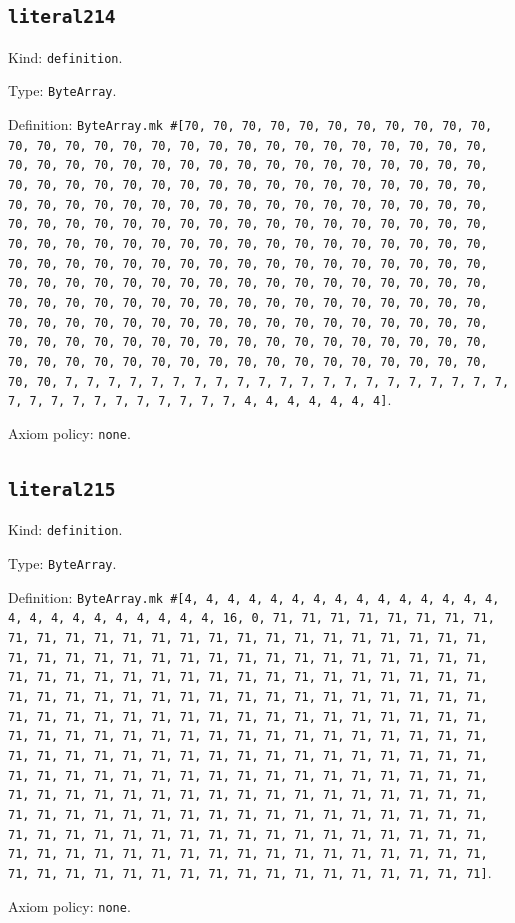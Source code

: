 \documentclass[11pt]{article}
\begin{document}
\subsection*{\texttt{literal214}}
\noindent Kind: \texttt{definition}.\par
\noindent Type: \texttt{ByteArray}.\par
\noindent Definition: \texttt{ByteArray.mk \#[70, 70, 70, 70, 70, 70, 70, 70, 70, 70, 70, 70, 70, 70, 70, 70, 70, 70, 70, 70, 70, 70, 70, 70, 70, 70, 70, 70, 70, 70, 70, 70, 70, 70, 70, 70, 70, 70, 70, 70, 70, 70, 70, 70, 70, 70, 70, 70, 70, 70, 70, 70, 70, 70, 70, 70, 70, 70, 70, 70, 70, 70, 70, 70, 70, 70, 70, 70, 70, 70, 70, 70, 70, 70, 70, 70, 70, 70, 70, 70, 70, 70, 70, 70, 70, 70, 70, 70, 70, 70, 70, 70, 70, 70, 70, 70, 70, 70, 70, 70, 70, 70, 70, 70, 70, 70, 70, 70, 70, 70, 70, 70, 70, 70, 70, 70, 70, 70, 70, 70, 70, 70, 70, 70, 70, 70, 70, 70, 70, 70, 70, 70, 70, 70, 70, 70, 70, 70, 70, 70, 70, 70, 70, 70, 70, 70, 70, 70, 70, 70, 70, 70, 70, 70, 70, 70, 70, 70, 70, 70, 70, 70, 70, 70, 70, 70, 70, 70, 70, 70, 70, 70, 70, 70, 70, 70, 70, 70, 70, 70, 70, 70, 70, 70, 70, 70, 70, 70, 70, 70, 70, 70, 70, 70, 70, 70, 70, 70, 70, 70, 70, 70, 70, 70, 70, 70, 70, 70, 70, 70, 70, 70, 70, 70, 70, 70, 70, 7, 7, 7, 7, 7, 7, 7, 7, 7, 7, 7, 7, 7, 7, 7, 7, 7, 7, 7, 7, 7, 7, 7, 7, 7, 7, 7, 7, 7, 7, 7, 7, 4, 4, 4, 4, 4, 4, 4]}.\par
\noindent Axiom policy: \texttt{none}.\par
\subsection*{\texttt{literal215}}
\noindent Kind: \texttt{definition}.\par
\noindent Type: \texttt{ByteArray}.\par
\noindent Definition: \texttt{ByteArray.mk \#[4, 4, 4, 4, 4, 4, 4, 4, 4, 4, 4, 4, 4, 4, 4, 4, 4, 4, 4, 4, 4, 4, 4, 4, 4, 16, 0, 71, 71, 71, 71, 71, 71, 71, 71, 71, 71, 71, 71, 71, 71, 71, 71, 71, 71, 71, 71, 71, 71, 71, 71, 71, 71, 71, 71, 71, 71, 71, 71, 71, 71, 71, 71, 71, 71, 71, 71, 71, 71, 71, 71, 71, 71, 71, 71, 71, 71, 71, 71, 71, 71, 71, 71, 71, 71, 71, 71, 71, 71, 71, 71, 71, 71, 71, 71, 71, 71, 71, 71, 71, 71, 71, 71, 71, 71, 71, 71, 71, 71, 71, 71, 71, 71, 71, 71, 71, 71, 71, 71, 71, 71, 71, 71, 71, 71, 71, 71, 71, 71, 71, 71, 71, 71, 71, 71, 71, 71, 71, 71, 71, 71, 71, 71, 71, 71, 71, 71, 71, 71, 71, 71, 71, 71, 71, 71, 71, 71, 71, 71, 71, 71, 71, 71, 71, 71, 71, 71, 71, 71, 71, 71, 71, 71, 71, 71, 71, 71, 71, 71, 71, 71, 71, 71, 71, 71, 71, 71, 71, 71, 71, 71, 71, 71, 71, 71, 71, 71, 71, 71, 71, 71, 71, 71, 71, 71, 71, 71, 71, 71, 71, 71, 71, 71, 71, 71, 71, 71, 71, 71, 71, 71, 71, 71, 71, 71, 71, 71, 71, 71, 71, 71, 71, 71, 71, 71, 71, 71, 71, 71, 71, 71, 71, 71, 71, 71, 71, 71, 71, 71, 71, 71, 71, 71, 71, 71, 71]}.\par
\noindent Axiom policy: \texttt{none}.\par
\end{document}
